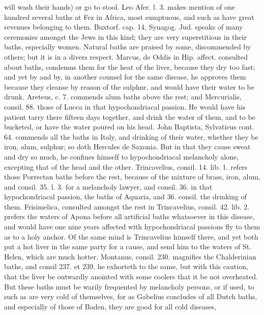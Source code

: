 {will wash their hands) or go to stool. Leo Afer. l. 3. makes mention of
one hundred several baths at Fez in Africa, most sumptuous, and such as
have great revenues belonging to them. Buxtorf. cap. 14, Synagog. Jud.
speaks of many ceremonies amongst the Jews in this kind; they are very
superstitious in their baths, especially women.
Natural baths are praised by some, discommended by others; but it is in
a divers respect. Marcus, de Oddis in Hip. affect. consulted
about baths, condemns them for the heat of the liver, because they dry
too fast; and yet by and by, in another counsel for the same
disease, he approves them because they cleanse by reason of the
sulphur, and would have their water to be drunk. Areteus, c. 7.
commends alum baths above the rest; and Mercurialis, consil. 88.
those of Lucca in that hypochondriacal passion. He would have his
patient tarry there fifteen days together, and drink the water of them,
and to be bucketed, or have the water poured on his head. John
Baptista, Sylvaticus cont. 64. commends all the baths in Italy, and
drinking of their water, whether they be iron, alum, sulphur; so doth
Hercules de Saxonia. But in that they cause sweat and dry so
much, he confines himself to hypochondriacal melancholy alone,
excepting that of the head and the other. Trincavelius, consil. 14.
lib. 1. refers those Porrectan baths before the rest, because of
the mixture of brass, iron, alum, and consil. 35. l. 3. for a
melancholy lawyer, and consil. 36. in that hypochondriacal passion, the
baths of Aquaria, and 36. consil. the drinking of them.
Frisimelica, consulted amongst the rest in Trincavelius, consil. 42.
lib. 2. prefers the waters of Apona before all artificial baths
whatsoever in this disease, and would have one nine years affected with
hypochondriacal passions fly to them as to a holy anchor. Of the
same mind is Trincavelius himself there, and yet both put a hot liver
in the same party for a cause, and send him to the waters of St. Helen,
which are much hotter. Montanus, consil. 230. magnifies the
Chalderinian baths, and consil 237. et 239. he exhorteth to the
same, but with this caution, that the liver be outwardly anointed
with some coolers that it be not overheated. But these baths must be
warily frequented by melancholy persons, or if used, to such as are
very cold of themselves, for as Gabelius concludes of all Dutch baths,
and especially of those of Baden, they are good for all cold diseases,
}
